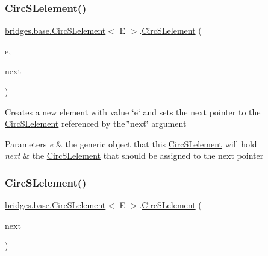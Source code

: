 \subsubsection{\texorpdfstring{Circ\+S\+Lelement()}{CircSLelement()}\hspace{0.1cm}{\footnotesize\ttfamily [3/4]}}
{\footnotesize\ttfamily \hyperlink{classbridges_1_1base_1_1_circ_s_lelement}{bridges.\+base.\+Circ\+S\+Lelement}$<$ E $>$.\hyperlink{classbridges_1_1base_1_1_circ_s_lelement}{Circ\+S\+Lelement} (\begin{DoxyParamCaption}\item[{E}]{e,  }\item[{\hyperlink{classbridges_1_1base_1_1_circ_s_lelement}{Circ\+S\+Lelement}$<$ E $>$}]{next }\end{DoxyParamCaption})}

Creates a new element with value \char`\"{}e\char`\"{} and sets the next pointer to the \hyperlink{classbridges_1_1base_1_1_circ_s_lelement}{Circ\+S\+Lelement} referenced by the \char`\"{}next\char`\"{} argument


\begin{DoxyParams}{Parameters}
{\em e} & the generic object that this \hyperlink{classbridges_1_1base_1_1_circ_s_lelement}{Circ\+S\+Lelement} will hold \\
\hline
{\em next} & the \hyperlink{classbridges_1_1base_1_1_circ_s_lelement}{Circ\+S\+Lelement} that should be assigned to the next pointer \\
\hline
\end{DoxyParams}
\hypertarget{classbridges_1_1base_1_1_circ_s_lelement_ab9e5b98e8d917760b9651a52785358b9}{}\label{classbridges_1_1base_1_1_circ_s_lelement_ab9e5b98e8d917760b9651a52785358b9} 
\subsubsection{\texorpdfstring{Circ\+S\+Lelement()}{CircSLelement()}\hspace{0.1cm}{\footnotesize\ttfamily [4/4]}}
{\footnotesize\ttfamily \hyperlink{classbridges_1_1base_1_1_circ_s_lelement}{bridges.\+base.\+Circ\+S\+Lelement}$<$ E $>$.\hyperlink{classbridges_1_1base_1_1_circ_s_lelement}{Circ\+S\+Lelement} (\begin{DoxyParamCaption}\item[{\hyperlink{classbridges_1_1base_1_1_circ_s_lelement}{Circ\+S\+Lelement}$<$ E $>$}]{next }\end{DoxyParamCaption})}

